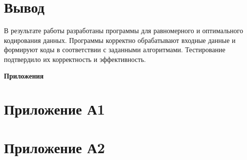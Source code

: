 \documentclass[oneside,a4paper,14pt]{extarticle}
\begin{document}
\newpage
\section*{Вывод}
В результате работы разработаны программы для равномерного и оптимального
кодирования данных. Программы корректно обрабатывают входные данные и формируют
коды в соответствии с заданными алгоритмами. Тестирование подтвердило их
корректность и эффективность.\\
\begin{flushright}
    \textcolor{black!30}{\textbf{Приложения}}
\end{flushright}
\section*{Приложение А1}
\newpage
\section*{Приложение А2}
\end{document}
